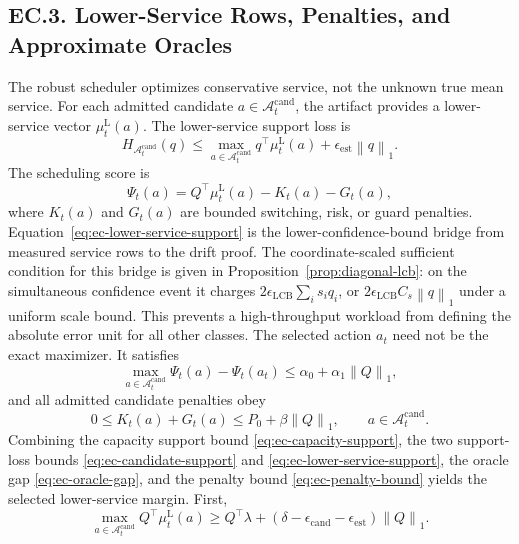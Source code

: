 \documentclass[opre,dblanonrev]{informs4}
\newcommand{\Acand}{\mathcal A^{\mathrm{cand}}}
\newcommand{\lowermu}{\mu^{\mathrm L}}
\newcommand{\normone}[1]{\left\|#1\right\|_1}
\begin{document}
\subsection*{EC.3. Lower-Service Rows, Penalties, and Approximate Oracles}

The robust scheduler optimizes conservative service, not the unknown true mean
service.  For each admitted candidate \(a\in\Acand_t\), the artifact provides a
lower-service vector \(\lowermu_t(a)\).  The lower-service support loss is
\begin{equation}
  \label{eq:ec-lower-service-support}
  H_{\Acand_t}(q)
  \le
  \max_{a\in\Acand_t}q^\top\lowermu_t(a)
  +\epsilon_{\mathrm{est}}\normone{q}.
\end{equation}
The scheduling score is
\begin{equation}
  \Psi_t(a)
  =
  Q^\top\lowermu_t(a)-K_t(a)-G_t(a),
\end{equation}
where \(K_t(a)\) and \(G_t(a)\) are bounded switching, risk, or guard penalties.
Equation~\eqref{eq:ec-lower-service-support} is the lower-confidence-bound
bridge from measured service rows to the drift proof.  The coordinate-scaled
sufficient condition for this bridge is given in
Proposition~\ref{prop:diagonal-lcb}: on the simultaneous confidence event it
charges \(2\epsilon_{\mathrm{LCB}}\sum_i s_iq_i\), or
\(2\epsilon_{\mathrm{LCB}}C_s\normone{q}\) under a uniform scale bound.  This
prevents a high-throughput workload from defining the absolute error unit for
all other classes.  The selected action
\(a_t\) need not be the exact maximizer.  It satisfies
\begin{equation}
  \label{eq:ec-oracle-gap}
  \max_{a\in\Acand_t}\Psi_t(a)-\Psi_t(a_t)
  \le \alpha_0+\alpha_1\normone{Q},
\end{equation}
and all admitted candidate penalties obey
\begin{equation}
  \label{eq:ec-penalty-bound}
  0\le K_t(a)+G_t(a)\le P_0+\beta\normone{Q},
  \qquad a\in\Acand_t.
\end{equation}
Combining the capacity support bound \eqref{eq:ec-capacity-support}, the two
support-loss bounds \eqref{eq:ec-candidate-support} and
\eqref{eq:ec-lower-service-support}, the oracle gap
\eqref{eq:ec-oracle-gap}, and the penalty bound
\eqref{eq:ec-penalty-bound} yields
the selected lower-service margin.  First,
\begin{equation}
  \max_{a\in\Acand_t}Q^\top\lowermu_t(a)
  \ge
  Q^\top\lambda+
  (\delta-\epsilon_{\mathrm{cand}}-\epsilon_{\mathrm{est}})\normone{Q}.
\end{equation}
\end{document}

